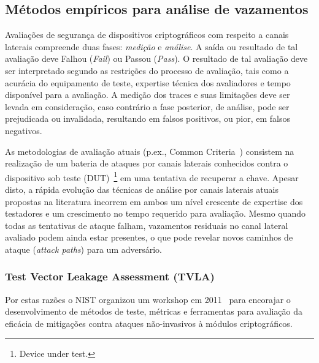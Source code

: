 
\subsection{Métodos empíricos para análise de vazamentos}


Avaliações de segurança de dispositivos criptográficos com respeito a canais laterais compreende duas fases: \textit{medição} e \textit{análise}.
%
A saída ou resultado de tal avaliação deve Falhou (\textit{Fail}) ou Passou (\textit{Pass}). 
%
O resultado de tal avaliação deve ser interpretado segundo as restrições do processo de avaliação, tais como a acurácia do equipamento de teste, expertise técnica dos avaliadores e tempo disponível para a avaliação.
%
A medição dos traces e suas limitações deve ser levada em consideração, caso contrário a fase posterior, de análise, pode ser prejudicada ou invalidada, resultando em falsos positivos, ou pior, em falsos negativos.

As metodologias de avaliação atuais (p.ex., Common Criteria~\cite{CommonCriteria2014}) consistem na realização de um bateria de ataques por canais laterais conhecidos contra o dispositivo sob teste (DUT)~\footnote{Device under test.} em uma tentativa de recuperar a chave. Apesar disto, a rápida evolução das técnicas de análise por canais laterais atuais propostas na literatura incorrem em ambos um nível crescente de expertise dos testadores e um crescimento no tempo requerido para avaliação. Mesmo quando todas as tentativas de ataque falham, vazamentos residuais no canal lateral avaliado podem ainda estar presentes, o que pode revelar novos caminhos de ataque (\textit{attack paths}) para um adversário.
%

\subsubsection{Test Vector Leakage Assessment (TVLA)}\label{sec-tvla}

Por estas razões o NIST organizou um workshop em 2011~\cite{NIST_NIAT_2011} para encorajar o desenvolvimento de métodos de teste, métricas e ferramentas para avaliação da eficácia de mitigações contra ataques não-invasivos à módulos criptográficos.

